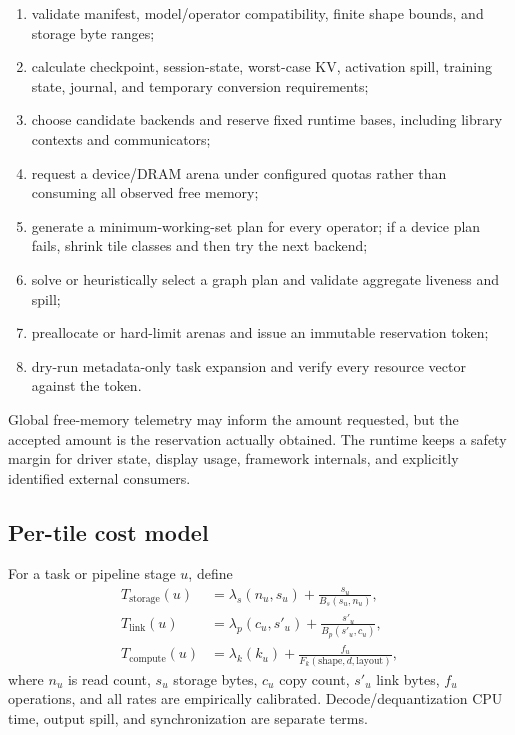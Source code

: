 \begin{enumerate}
  \item validate manifest, model/operator compatibility, finite shape bounds, and storage byte ranges;
  \item calculate checkpoint, session-state, worst-case KV, activation spill, training state, journal, and temporary conversion requirements;
  \item choose candidate backends and reserve fixed runtime bases, including library contexts and communicators;
  \item request a device/DRAM arena under configured quotas rather than consuming all observed free memory;
  \item generate a minimum-working-set plan for every operator; if a device plan fails, shrink tile classes and then try the next backend;
  \item solve or heuristically select a graph plan and validate aggregate liveness and spill;
  \item preallocate or hard-limit arenas and issue an immutable reservation token;
  \item dry-run metadata-only task expansion and verify every resource vector against the token.
\end{enumerate}

Global free-memory telemetry may inform the amount requested, but the accepted amount is the reservation actually obtained. The runtime keeps a safety margin for driver state, display usage, framework internals, and explicitly identified external consumers.

\subsection{Per-tile cost model}

For a task or pipeline stage $u$, define
\begin{align}
T_{\mathrm{storage}}(u)&=\lambda_s(n_u,s_u)+\frac{s_u}{B_s(s_u,n_u)},\\
T_{\mathrm{link}}(u)&=\lambda_p(c_u,s'_u)+\frac{s'_u}{B_p(s'_u,c_u)},\\
T_{\mathrm{compute}}(u)&=\lambda_k(k_u)+\frac{f_u}{F_k(\text{shape},d,\text{layout})},
\end{align}
where $n_u$ is read count, $s_u$ storage bytes, $c_u$ copy count, $s'_u$ link bytes, $f_u$ operations, and all rates are empirically calibrated. Decode/dequantization CPU time, output spill, and synchronization are separate terms.

